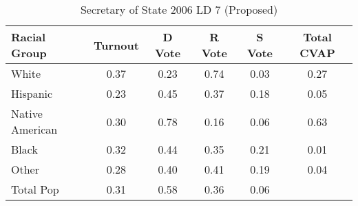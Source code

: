 \begin{table}[htb]
\begin{center}
\caption{Secretary of State 2006 LD 7 (Proposed)}
\label{sos06_cvap_ld_7}
\begin{tabular}{lccccc}
  \hline
Racial Group & Turnout & D Vote & R Vote & S Vote & Total CVAP \\ 
  \hline
White & 0.37 & 0.23 & 0.74 & 0.03 & 0.27 \\ 
  Hispanic & 0.23 & 0.45 & 0.37 & 0.18 & 0.05 \\ 
  Native American & 0.30 & 0.78 & 0.16 & 0.06 & 0.63 \\ 
  Black & 0.32 & 0.44 & 0.35 & 0.21 & 0.01 \\ 
  Other & 0.28 & 0.40 & 0.41 & 0.19 & 0.04 \\ 
  Total Pop & 0.31 & 0.58 & 0.36 & 0.06 &  \\ 
   \hline
\end{tabular}
\end{center}
\end{table}
